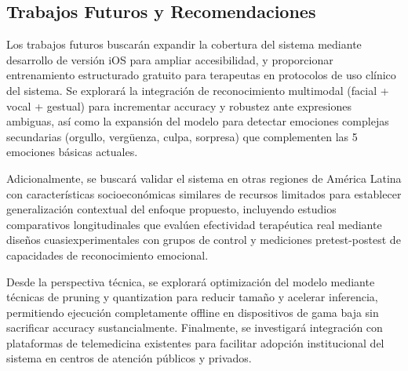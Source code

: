 \documentclass[journal,article,submit,pdftex,moreauthors]{Definitions/mdpi}
\begin{document}
	\subsection{Trabajos Futuros y Recomendaciones}
	
	Los trabajos futuros buscarán expandir la cobertura del sistema mediante desarrollo de versión iOS para ampliar accesibilidad, y proporcionar entrenamiento estructurado gratuito para terapeutas en protocolos de uso clínico del sistema. Se explorará la integración de reconocimiento multimodal (facial + vocal + gestual) para incrementar accuracy y robustez ante expresiones ambiguas, así como la expansión del modelo para detectar emociones complejas secundarias (orgullo, vergüenza, culpa, sorpresa) que complementen las 5 emociones básicas actuales.
	
	Adicionalmente, se buscará validar el sistema en otras regiones de América Latina con características socioeconómicas similares de recursos limitados para establecer generalización contextual del enfoque propuesto, incluyendo estudios comparativos longitudinales que evalúen efectividad terapéutica real mediante diseños cuasiexperimentales con grupos de control y mediciones pretest-postest de capacidades de reconocimiento emocional.
	
	Desde la perspectiva técnica, se explorará optimización del modelo mediante técnicas de pruning y quantization para reducir tamaño y acelerar inferencia, permitiendo ejecución completamente offline en dispositivos de gama baja sin sacrificar accuracy sustancialmente. Finalmente, se investigará integración con plataformas de telemedicina existentes para facilitar adopción institucional del sistema en centros de atención públicos y privados.
	
	\vspace{6pt}
	
	
	
	
\end{document}
